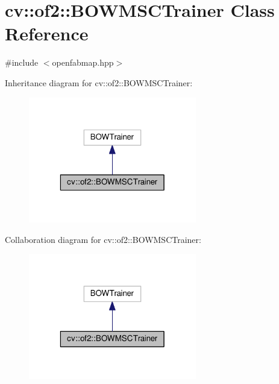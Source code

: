 \hypertarget{classcv_1_1of2_1_1BOWMSCTrainer}{\section{cv\-:\-:of2\-:\-:B\-O\-W\-M\-S\-C\-Trainer Class Reference}
\label{classcv_1_1of2_1_1BOWMSCTrainer}
}


{\ttfamily \#include $<$openfabmap.\-hpp$>$}



Inheritance diagram for cv\-:\-:of2\-:\-:B\-O\-W\-M\-S\-C\-Trainer\-:\nopagebreak
\begin{figure}[H]
\begin{center}
\leavevmode
\includegraphics[width=208pt]{classcv_1_1of2_1_1BOWMSCTrainer__inherit__graph}
\end{center}
\end{figure}


Collaboration diagram for cv\-:\-:of2\-:\-:B\-O\-W\-M\-S\-C\-Trainer\-:\nopagebreak
\begin{figure}[H]
\begin{center}
\leavevmode
\includegraphics[width=208pt]{classcv_1_1of2_1_1BOWMSCTrainer__coll__graph}
\end{center}
\end{figure}
